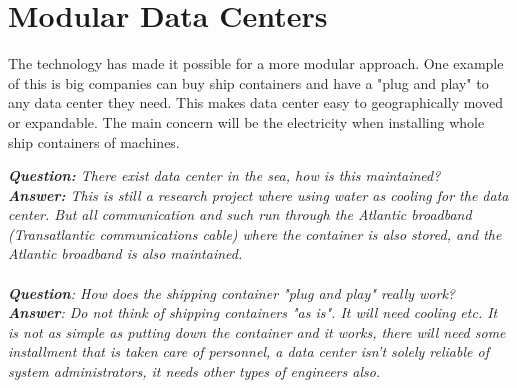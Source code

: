 \documentclass[twoside]{article}
\begin{document}
\section{Modular Data Centers}
The technology has made it possible for a more modular approach. One example of this is big companies can buy ship containers and have a "plug and play" to any data center they need. This makes data center easy to geographically moved or expandable. The main concern will be the electricity when installing whole ship containers of machines.

\emph{\textbf{Question:} There exist data center in the sea, how is this maintained?}
\\\emph{\textbf{Answer:} This is still a research project where using water as cooling for the data center. But all communication and such run through the Atlantic broadband (Transatlantic communications cable) where the container is also stored, and the Atlantic broadband is also maintained.}\\
\\\emph{\textbf{Question}: How does the shipping container "plug and play" really work?}
\\\emph{\textbf{Answer}: Do not think of shipping containers "as is". It will need cooling etc. It is not as simple as putting down the container and it works, there will need some installment that is taken care of personnel, a data center isn't solely reliable of system administrators, it needs other types of engineers also.}
\end{document}
